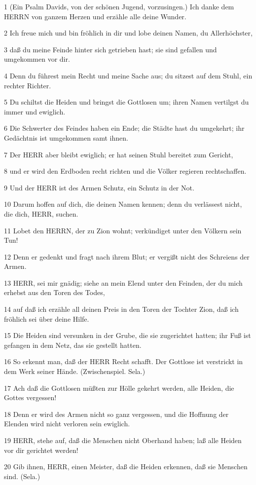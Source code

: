 \par 1 (Ein Psalm Davids, von der schönen Jugend, vorzusingen.) Ich danke dem HERRN von ganzem Herzen und erzähle alle deine Wunder.
\par 2 Ich freue mich und bin fröhlich in dir und lobe deinen Namen, du Allerhöchster,
\par 3 daß du meine Feinde hinter sich getrieben hast; sie sind gefallen und umgekommen vor dir.
\par 4 Denn du führest mein Recht und meine Sache aus; du sitzest auf dem Stuhl, ein rechter Richter.
\par 5 Du schiltst die Heiden und bringst die Gottlosen um; ihren Namen vertilgst du immer und ewiglich.
\par 6 Die Schwerter des Feindes haben ein Ende; die Städte hast du umgekehrt; ihr Gedächtnis ist umgekommen samt ihnen.
\par 7 Der HERR aber bleibt ewiglich; er hat seinen Stuhl bereitet zum Gericht,
\par 8 und er wird den Erdboden recht richten und die Völker regieren rechtschaffen.
\par 9 Und der HERR ist des Armen Schutz, ein Schutz in der Not.
\par 10 Darum hoffen auf dich, die deinen Namen kennen; denn du verlässest nicht, die dich, HERR, suchen.
\par 11 Lobet den HERRN, der zu Zion wohnt; verkündiget unter den Völkern sein Tun!
\par 12 Denn er gedenkt und fragt nach ihrem Blut; er vergißt nicht des Schreiens der Armen.
\par 13 HERR, sei mir gnädig; siehe an mein Elend unter den Feinden, der du mich erhebst aus den Toren des Todes,
\par 14 auf daß ich erzähle all deinen Preis in den Toren der Tochter Zion, daß ich fröhlich sei über deine Hilfe.
\par 15 Die Heiden sind versunken in der Grube, die sie zugerichtet hatten; ihr Fuß ist gefangen in dem Netz, das sie gestellt hatten.
\par 16 So erkennt man, daß der HERR Recht schafft. Der Gottlose ist verstrickt in dem Werk seiner Hände. (Zwischenspiel. Sela.)
\par 17 Ach daß die Gottlosen müßten zur Hölle gekehrt werden, alle Heiden, die Gottes vergessen!
\par 18 Denn er wird des Armen nicht so ganz vergessen, und die Hoffnung der Elenden wird nicht verloren sein ewiglich.
\par 19 HERR, stehe auf, daß die Menschen nicht Oberhand haben; laß alle Heiden vor dir gerichtet werden!
\par 20 Gib ihnen, HERR, einen Meister, daß die Heiden erkennen, daß sie Menschen sind. (Sela.)


